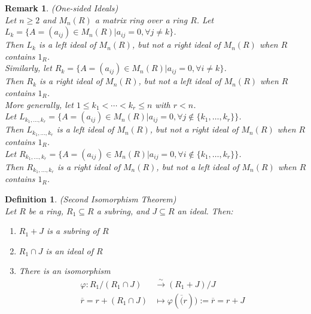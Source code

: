 \documentclass[a4paper,8pt]{article}
\theoremstyle{theorem}
\newtheorem{definition}[theorem]{Definition}
\newtheorem{remark}[theorem]{Remark}
\begin{document}
\begin{remark}
\textit{{\color{blue} (One-sided Ideals)}}\\
Let $n \geq 2$ and $M_n(R)$ a matrix ring over a ring $R$. Let $L_k = \{A = (a_{ij}) \in M_n(R) | a_{ij} = 0, \forall j \neq k\}$.\\
Then $L_k$ is a left ideal of $M_n(R)$, but not a right ideal of $M_n(R)$ when $R$ contains $1_R$.\\
Similarly, let $R_k = \{A = (a_{ij}) \in M_n(R) | a_{ij} = 0, \forall i \neq k\}$.\\
Then $R_k$ is a right ideal of $M_n(R)$, but not a left ideal of $M_n(R)$ when $R$ contains $1_R$.\\

More generally, let $1 \leq k_1 < \cdots < k_r \leq n$ with $r < n$.\\
Let $L_{k_1, \ldots, k_r} = \{A = (a_{ij}) \in M_n(R) | a_{ij} = 0, \forall j \notin \{k_1, \ldots, k_r\}\}$.\\
Then $L_{k_1, \ldots, k_r}$ is a left ideal of $M_n(R)$, but not a right ideal of $M_n(R)$ when $R$ contains $1_R$.\\
Let $R_{k_1, \ldots, k_r} = \{A = (a_{ij}) \in M_n(R) | a_{ij} = 0, \forall i \notin \{k_1, \ldots, k_r\}\}$.\\
Then $R_{k_1, \ldots, k_r}$ is a right ideal of $M_n(R)$, but not a left ideal of $M_n(R)$ when $R$ contains $1_R$.\\
\end{remark}


\begin{definition}
\textit{{\color{blue} (Second Isomorphism Theorem)}}\\
Let $R$ be a ring, $R_1 \subseteq R$ a subring, and $J \subseteq R$ an ideal. Then:
\begin{enumerate}[label=(\roman*)]
\item $R_1 + J$ is a subring of $R$
\item $R_1 \cap J$ is an ideal of $R$
\item There is an isomorphism 
\begin{align}
\varphi: R_1/(R_1 \cap J) &\xrightarrow{\sim} (R_1 + J)/J \nonumber \\
\overline{r} = r + (R_1 \cap J) &\mapsto \varphi(\overline(r)) := \overline{r} = r+J \nonumber
\end{align}
\end{enumerate}
\end{definition}
\end{document}
